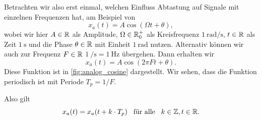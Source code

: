 Betrachten wir also erst einmal, welchen Einfluss Abtastung auf Signale mit einzelnen Frequenzen hat, am Beispiel von
%
\begin{equation}\label{eq:analog_cosine}
    x_a(t) = A \cos(\Omega t + \theta),
\end{equation}
%
wobei wir hier $A \in \mathbb{R}$ als Amplitude, $\Omega \in \mathbb{R}^+_0$ als Kreisfrequenz $\SI{1}{\radian\per\second}$, $t \in \mathbb{R}$ als Zeit $\SI{1}{\second}$ und die Phase $\theta \in \mathbb{R}$ mit Einheit $\SI{1}{\radian}$ nutzen.
Alternativ können wir auch zur Frequenz $F \in \mathbb{R}$ $\SI{1}{\per\second} = \SI{1}{\hertz}$ übergehen.
Dann erhalten wir
\[
x_a(t) = A \cos(2 \pi F t + \theta).
\]
Diese Funktion ist in \cref{fig:analog_cosine} dargestellt.
Wir sehen, dass die Funktion periodisch ist mit Periode $T_p = 1/F$.

Also gilt
\[
x_a(t) = x_a(t + k \cdot T_p) {\hspace{3mm} \text{für alle} \hspace{3mm}} k \in \mathbb{Z}, t \in \mathbb{R}.
\]

